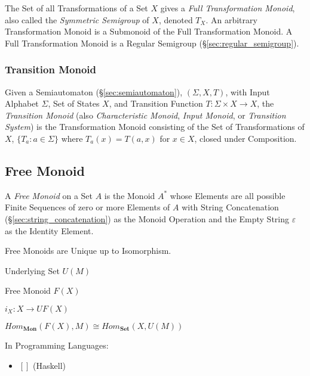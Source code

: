 The Set of all Transformations of a Set $X$ gives a \emph{Full
  Transformation Monoid}, also called the \emph{Symmetric Semigroup}
of $X$, denoted $T_X$. An arbitrary Transformation Monoid is a
Submonoid of the Full Transformation Monoid. A Full Transformation
Monoid is a Regular Semigroup (\S\ref{sec:regular_semigroup}).



\subsubsection{Transition Monoid}\label{sec:transition_monoid}

Given a Semiautomaton (\S\ref{sec:semiautomaton}), $(\Sigma, X, T)$,
with Input Alphabet $\Sigma$, Set of States $X$, and Transition
Function $T : \Sigma \times X \rightarrow X$, the \emph{Transition
  Monoid} (also \emph{Characteristic Monoid}, \emph{Input Monoid}, or
\emph{Transition System}) is the Transformation Monoid consisting of
the Set of Transformations of $X$, $\{T_a : a \in \Sigma\}$ where
$T_a(x) = T(a,x)$ for $x \in X$, closed under Composition.



\subsection{Free Monoid}\label{sec:free_monoid}

A \emph{Free Monoid} on a Set $A$ is the Monoid $A^*$ whose Elements
are all possible Finite Sequences of zero or more Elements of $A$ with
String Concatenation (\S\ref{sec:string_concatenation}) as the Monoid
Operation and the Empty String $\varepsilon$ as the Identity Element.

Free Monoids are Unique up to Isomorphism.

Underlying Set $U(M)$

Free Monoid $F(X)$

$i_X : X \rightarrow U F (X)$

$Hom_\mathbf{Mon}(F(X), M) \cong Hom_\mathbf{Set}(X, U(M))$

In Programming Languages:

\begin{itemize}
  \item $\mathtt{[]}$ (Haskell)
\end{itemize}



